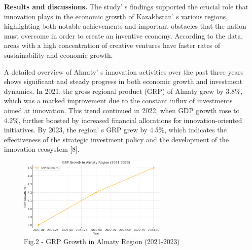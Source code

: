 \begin{multicols}{2}
{\bfseries Results and discussions.} The study' s findings
supported the crucial role that innovation plays in the economic growth
of Kazakhstan' s various regions, highlighting both
notable achievements and important obstacles that the nation must
overcome in order to create an inventive economy. According to the data,
areas with a high concentration of creative ventures have faster rates
of sustainability and economic growth.

A detailed overview of Almaty' s innovation activities
over the past three years shows significant and steady progress in both
economic growth and investment dynamics. In 2021, the gross regional
product (GRP) of Almaty grew by 3.8\%, which was a marked improvement
due to the constant influx of investments aimed at innovation. This
trend continued in 2022, when GDP growth rose to 4.2\%, further boosted
by increased financial allocations for innovation-oriented initiatives.
By 2023, the region' s GRP grew by 4.5\%, which indicates
the effectiveness of the strategic investment policy and the development
of the innovation ecosystem {[}8{]}.
\end{multicols}

\begin{figure}[H]
	\centering
	\includegraphics[width=0.65\textwidth]{media/ekon/image4}
	\caption*{Fig.2 - GRP Growth in Almaty Region (2021-2023)}
\end{figure}

